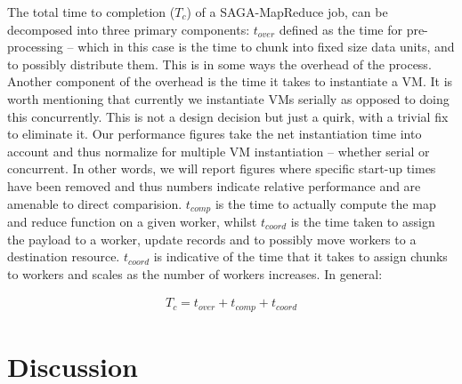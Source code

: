 \documentclass[conference,final]{IEEEtran}
\newcommand{\sagamapreduce }{SAGA-MapReduce }
\begin{document}
The total time to completion ($T_c$) of a \sagamapreduce job, can be
decomposed into three primary components: $t_{over}$ defined as the
time for pre-processing -- which in this case is the time to chunk
into fixed size data units, and to possibly distribute them. This is
in some ways the overhead of the process.  Another component of the
overhead is the time it takes to instantiate a VM. It is worth
mentioning that currently we instantiate VMs serially as opposed to
doing this concurrently. This is not a design decision but just a
quirk, with a trivial fix to eliminate it.  Our performance figures
take the net instantiation time into account and thus normalize for
multiple VM instantiation -- whether serial or concurrent. In other
words, we will report figures where specific start-up times have been
removed and thus numbers indicate relative performance and are
amenable to direct comparision.  $t_{comp}$ is the time to actually
compute the map and reduce function on a given worker, whilst
$t_{coord}$ is the time taken to assign the payload to a worker,
update records and to possibly move workers to a destination
resource. $t_{coord}$ is indicative of the time that it takes to
assign chunks to workers and scales as the number of workers
increases. In general:

\vspace{-1em}
\begin{eqnarray}
T_c = t_{over} + t_{comp} + t_{coord}
\end{eqnarray}





\section{Discussion}


\end{document}
